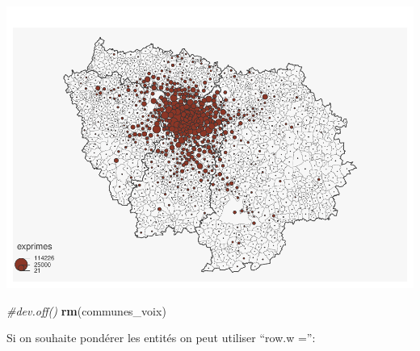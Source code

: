 \documentclass[
]{book}
\newenvironment{Shaded}{\begin{snugshade}}{\end{snugshade}}
\newcommand{\AttributeTok}[1]{\textcolor[rgb]{0.13,0.29,0.53}{#1}}
\newcommand{\CommentTok}[1]{\textcolor[rgb]{0.56,0.35,0.01}{\textit{#1}}}
\newcommand{\ConstantTok}[1]{\textcolor[rgb]{0.56,0.35,0.01}{#1}}
\newcommand{\DecValTok}[1]{\textcolor[rgb]{0.00,0.00,0.81}{#1}}
\newcommand{\FunctionTok}[1]{\textcolor[rgb]{0.13,0.29,0.53}{\textbf{#1}}}
\newcommand{\NormalTok}[1]{#1}
\newcommand{\OtherTok}[1]{\textcolor[rgb]{0.56,0.35,0.01}{#1}}
\newcommand{\SpecialCharTok}[1]{\textcolor[rgb]{0.81,0.36,0.00}{\textbf{#1}}}
\begin{document}
\includegraphics{bookdown-demo_files/figure-latex/unnamed-chunk-59-1.pdf}

\begin{Shaded}
\begin{Highlighting}[]
\CommentTok{\#dev.off()}
\FunctionTok{rm}\NormalTok{(communes\_voix)}
\end{Highlighting}
\end{Shaded}

Si on souhaite pondérer les entités on peut utiliser ``row.w ='':

\begin{Shaded}
\end{Shaded}
\end{document}
